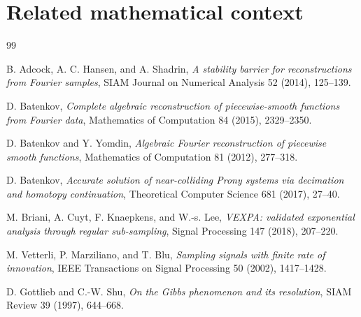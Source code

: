\documentclass[11pt,oneside,openany]{book}
\theoremstyle{definition}
\theoremstyle{remark}
\begin{document}
\chapter{Related mathematical context}

\begin{thebibliography}{99}

B. Adcock, A. C. Hansen, and A. Shadrin,
\emph{A stability barrier for reconstructions from Fourier samples},
SIAM Journal on Numerical Analysis 52 (2014), 125--139.

D. Batenkov,
\emph{Complete algebraic reconstruction of piecewise-smooth functions from Fourier data},
Mathematics of Computation 84 (2015), 2329--2350.

D. Batenkov and Y. Yomdin,
\emph{Algebraic Fourier reconstruction of piecewise smooth functions},
Mathematics of Computation 81 (2012), 277--318.

D. Batenkov,
\emph{Accurate solution of near-colliding Prony systems via decimation and homotopy continuation},
Theoretical Computer Science 681 (2017), 27--40.

M. Briani, A. Cuyt, F. Knaepkens, and W.-s. Lee,
\emph{VEXPA: validated exponential analysis through regular sub-sampling},
Signal Processing 147 (2018), 207--220.

M. Vetterli, P. Marziliano, and T. Blu,
\emph{Sampling signals with finite rate of innovation},
IEEE Transactions on Signal Processing 50 (2002), 1417--1428.

D. Gottlieb and C.-W. Shu,
\emph{On the Gibbs phenomenon and its resolution},
SIAM Review 39 (1997), 644--668.

\end{thebibliography}
\end{document}
